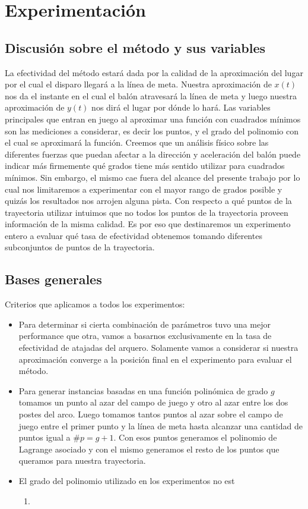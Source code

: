 \section{Experimentación}

\subsection{Discusión sobre el método y sus variables}
La efectividad del método estará dada por la calidad de la aproximación del lugar por el cual el disparo llegará a la línea de meta. 
Nuestra aproximación de $x(t)$ nos da el instante en el cual el balón atravesará la línea de meta y luego nuestra aproximación
de $y(t)$ nos dirá el lugar por dónde lo hará. Las variables principales que entran en juego al aproximar una función con 
cuadrados mínimos son las mediciones a considerar, es decir los puntos, y el grado del polinomio con el cual se aproximará la función.
Creemos que un análisis físico sobre las diferentes fuerzas que puedan afectar a la dirección y aceleración del balón puede indicar 
más firmemente qué grados tiene más sentido utilizar para cuadrados mínimos. Sin embargo, el mismo cae fuera del alcance del presente 
trabajo por lo cual nos limitaremos a experimentar con el mayor rango de grados posible y quizás los resultados nos arrojen alguna pista.
Con respecto a qué puntos de la trayectoria utilizar intuimos que no todos los puntos de la trayectoria proveen información de la misma 
calidad. Es por eso que destinaremos un experimento entero a evaluar qué tasa de efectividad obtenemos tomando diferentes subconjuntos 
de puntos de la trayectoria.

\subsection{Bases generales}
Criterios que aplicamos a todos los experimentos:
\begin{itemize}
	\item Para determinar si cierta combinación de parámetros tuvo una mejor performance que otra, vamos a basarnos exclusivamente en la tasa 
	de efectividad de atajadas del arquero. Solamente vamos a considerar si nuestra aproximación converge a la posición final en el experimento para 
	evaluar el método.
	\item Para generar instancias basadas en una función polinómica de grado $g$ tomamos un punto al azar del campo de juego y otro al azar entre los dos postes 
del arco. Luego tomamos tantos puntos al azar sobre el campo de juego entre el primer punto y la línea de meta hasta alcanzar una cantidad
de puntos igual a $\#p = g + 1$. Con esos puntos generamos el polinomio de Lagrange asociado y con el mismo generamos el resto de los puntos
que queramos para nuestra trayectoria.
	\item El grado del polinomio utilizado en los experimentos no est
	\begin{enumerate}
		\item
	\end{enumerate}
\end{itemize}

